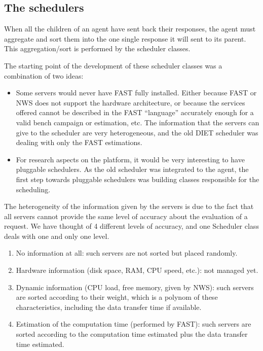 

\subsection{The schedulers}

When all the children of an agent have sent back their responses, the agent must
aggregate and sort them into the one single response it will sent to its parent.
This aggregation/sort is performed by the scheduler classes.

The starting point of the development of these scheduler classes was a
combination of two ideas:
\begin{itemize}
\item Some servers would never have FAST fully installed. Either because FAST or
  NWS does not support the hardware architecture, or because the services
  offered cannot be described in the FAST ``language'' accurately enough for a
  valid bench campaign or estimation, etc. The information that the servers can
  give to the scheduler are very heterogeneous, and the old DIET scheduler was
  dealing with only the FAST estimations.
\item For research aspects on the platform, it would be very interesting to
  have pluggable schedulers. As the old scheduler was integrated to the agent,
  the first step towards pluggable schedulers was building classes responsible
  for the scheduling.
\end{itemize}

The heterogeneity of the information given by the servers is due to the fact
that all servers cannot provide the same level of accuracy about the evaluation
of a request. We have thought of 4 different levels of accuracy, and one
\textsf{Scheduler} class deals with one and only one level.
\begin{enumerate}
\item No information at all: such servers are not sorted but placed randomly.
\item Hardware information (disk space, RAM, CPU speed, etc.): not managed yet.
\item Dynamic information (CPU load, free memory, given by NWS): such servers
  are sorted according to their weight, which is a polynom of these
  characteristics, including the data transfer time if available.
\item Estimation of the computation time (performed by FAST): such servers
  are sorted according to the computation time estimated plus the data transfer
  time estimated.
\end{enumerate}

